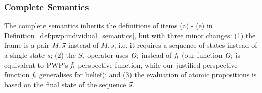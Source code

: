 

\subsubsection{Complete Semantics}

The complete semantics inherits the definitions of items (a) - (e) in Definition~\ref{def:pwp:individual_semantics}, but with three minor changes:
(1) the frame is a pair $M, \Vec{s}$ instead of $M, s$, i.e. it requires a sequence of states instead of a single state $s$; (2) the $S_i$ operator uses $\mathit{O}_i$ instead of $\mathit{f}_i$ (our function $\mathit{O}_i$ is equivalent to PWP's $\mathit{f}_i$ perspective function, while our justified perspective function $\mathit{f}_i$ generalises for belief);
and (3) the evaluation of atomic propositions is based on the final state of the sequence $\Vec{s}$.

